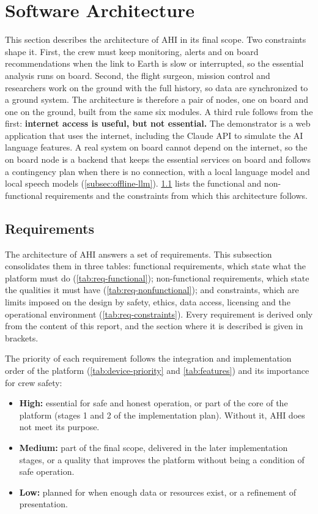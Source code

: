 \section{Software Architecture}
\label{sec:software-architecture}

This section describes the architecture of AHI in its final scope. Two constraints shape it. First, the crew must keep monitoring, alerts and on board recommendations when the link to Earth is slow or interrupted, so the essential analysis runs on board. Second, the flight surgeon, mission control and researchers work on the ground with the full history, so data are synchronized to a ground system. The architecture is therefore a pair of nodes, one on board and one on the ground, built from the same six modules. A third rule follows from the first: \textbf{internet access is useful, but not essential.} The demonstrator is a web application that uses the internet, including the Claude API to simulate the AI language features. A real system on board cannot depend on the internet, so the on board node is a backend that keeps the essential services on board and follows a contingency plan when there is no connection, with a local language model and local speech models (\ref{subsec:offline-llm}). \ref{subsec:requirements} lists the functional and non-functional requirements and the constraints from which this architecture follows.

\subsection{Requirements}
\label{subsec:requirements}

The architecture of AHI answers a set of requirements. This subsection consolidates them in three tables: functional requirements, which state what the platform must do (\ref{tab:req-functional}); non-functional requirements, which state the qualities it must have (\ref{tab:req-nonfunctional}); and constraints, which are limits imposed on the design by safety, ethics, data access, licensing and the operational environment (\ref{tab:req-constraints}). Every requirement is derived only from the content of this report, and the section where it is described is given in brackets.

The priority of each requirement follows the integration and implementation order of the platform (\ref{tab:device-priority} and \ref{tab:features}) and its importance for crew safety:

\begin{itemize}
\item \textbf{High:} essential for safe and honest operation, or part of the core of the platform (stages 1 and 2 of the implementation plan). Without it, AHI does not meet its purpose.
\item \textbf{Medium:} part of the final scope, delivered in the later implementation stages, or a quality that improves the platform without being a condition of safe operation.
\item \textbf{Low:} planned for when enough data or resources exist, or a refinement of presentation.
\end{itemize}

